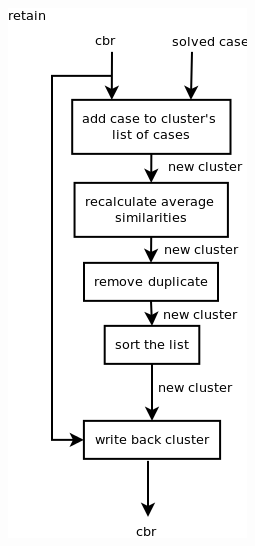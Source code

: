 \documentclass[11pt]{article}
\begin{document}
\includegraphics[width=\linewidth,height=\textheight,keepaspectratio]{retain.png}
\end{document}
